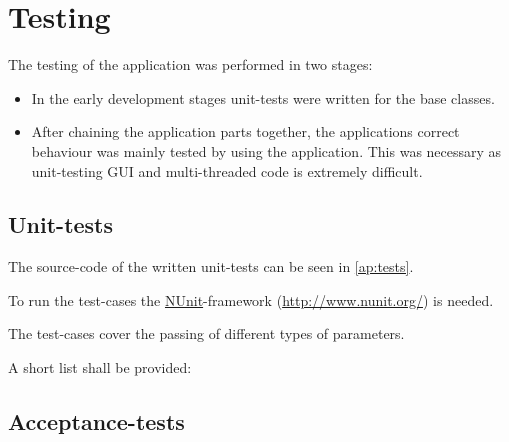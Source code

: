 \chapter{Testing}\label{ch:testing} %

The testing of the application was performed in two stages:

\begin{itemize}
\item In the early development stages unit-tests were written for the base classes.
\item After chaining the application parts together, the applications correct behaviour was mainly tested by using the application. This was necessary as unit-testing \ac{GUI} and multi-threaded code is extremely difficult.
\end{itemize}

\section{Unit-tests}
\label{sec:unit_tests}

The source-code of the written unit-tests can be seen in \autoref{ap:tests}.

To run the test-cases the \href{http://www.nunit.org/}{NUnit}-framework (\url{http://www.nunit.org/}) is needed.

The test-cases cover the passing of different types of parameters.

A short list shall be provided:



\section{Acceptance-tests}
\label{sec:acceptance_tests}
